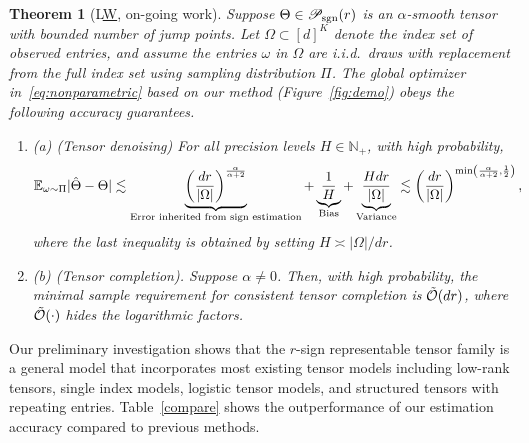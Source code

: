 \documentclass[11pt]{article}
\theoremstyle{exampstyle}
\newtheorem{thm}{Theorem}[section]
\theoremstyle{definition}
\def\caliP{\mathscr{P}_{\textup{sgn}}}
\begin{document}
 \begin{thm}[L\underline{W}, on-going work] 
 Suppose $\Theta\in\caliP(r)$ is an $\alpha$-smooth tensor with bounded number of jump points. Let $\Omega\subset[d]^K$ denote the index set of observed entries, and assume the entries $\omega$ in $\Omega$ are i.i.d.\ draws with replacement from the full index set using sampling distribution $\Pi$. The global optimizer in~\eqref{eq:nonparametric} based on our method (Figure~\ref{fig:demo}) obeys the following accuracy guarantees.
 \begin{enumerate}[wide]
\item[] (a) (Tensor denoising) For all precision levels $H\in\mathbb{N}_{+}$, with high probability,
{\small \begin{align}\label{eq:bound2}
\mathbb{E}_{\omega\sim \Pi}|\hat \Theta- \Theta|&\lesssim \underbrace{\left({d r\over |\Omega|}\right)^{\alpha\over\alpha+2}}_{\text{Error inherited from sign estimation}}+\underbrace{{1\over H}}_{\text{Bias}}+\underbrace{{Hd r \over |\Omega|}}_{\text{Variance}}\lesssim \left( dr\over|\Omega|\right)^{\min\left({\frac{\alpha}{\alpha+2},\frac{1}{2}}\right)},
\end{align}
}
where the last inequality is obtained by setting $H\asymp|\Omega|/dr$. 
\item[] (b) (Tensor completion). Suppose $\alpha\neq 0$. Then, with high probability, the minimal sample requirement for consistent tensor completion is $\tilde{\mathcal{O}} (dr)$, where $\tilde{\mathcal{O}}(\cdot)$ hides the logarithmic factors.
    \end{enumerate}
    \end{thm}
    
Our preliminary investigation shows that the $r$-sign representable tensor family is a general model that incorporates most existing tensor models including low-rank tensors, single index models, logistic tensor models, and structured tensors with repeating entries. Table~\ref{compare} shows the outperformance of our estimation accuracy compared to previous methods. 
\end{document}
